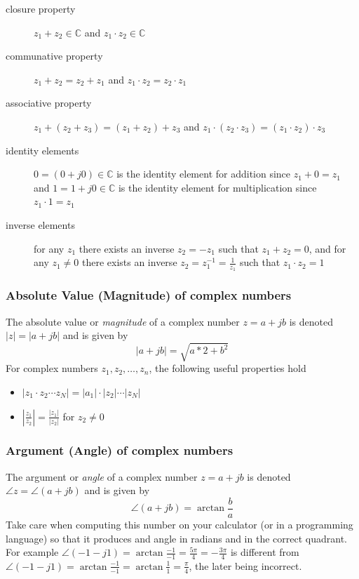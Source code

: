\begin{description}
\item[closure property] $z_1 + z_2 \in \mathbb{C}$ and  $z_1 \cdot z_2 \in \mathbb{C}$ 
\item[communative property] $z_1 + z_2 = z_2 + z_1$ and $z_1 \cdot z_2 = z_2 \cdot z_1$ 
\item[associative property] $z_1 + (z_2 + z_3) = (z_1 + z_2) + z_3$ and $z_1 \cdot (z_2 \cdot z_3) = (z_1 \cdot z_2) \cdot z_3$ 
\item[identity elements] $0 = (0 + j0) \in \mathbb{C}$ is the identity element for addition since $z_1 + 0 = z_1$ and $1 = 1 + j0 \in \mathbb{C}$ is the identity element for multiplication since $z_1\cdot 1 = z_1$ 
\item[inverse elements] for any $z_1$ there exists an inverse $z_2 = -z_1$ such that $z_1 + z_2 = 0$, and for any $z_1 \neq 0$ there exists an inverse $z_2 = z_1^{-1} = \tfrac{1}{z_1}$ such that $z_1 \cdot z_2 = 1$
\end{description}

\subsubsection*{Absolute Value (Magnitude) of complex numbers}

The absolute value or \textit{magnitude} of a complex number $z = a + jb$ is denoted $|z| = |a+jb|$ and is given by
\[
|a + jb| = \sqrt{a*2 + b^2}
\]
For complex numbers $z_1, z_2, \ldots, z_n$, the following useful properties hold
\begin{itemize}
\item $|z_1\cdot z_2 \cdots z_N| = |a_1|\cdot |z_2|\cdots|z_N|$
\item $\left| \frac{z_1}{z_2}\right| = \frac{|z_1|}{|z_2|}$ for $z_2 \neq 0$
\end{itemize}

\subsubsection*{Argument (Angle) of complex numbers}
The argument or \textit{angle} of a complex number $z = a + jb$ is denoted $\angle z = \angle(a+jb)$ and is given by
\[
\angle(a + jb) = \arctan\frac{b}{a}
\]
Take care when computing this number on your calculator (or in a programming language) so that it produces and angle in radians and in the correct quadrant. For example $\angle(-1-j1) = \arctan\frac{-1}{-1} = \frac{5\pi}{4} = -\frac{3\pi}{4}$ is different from $\angle(-1-j1) = \arctan\frac{-1}{-1} = \arctan\frac{1}{1} = \frac{\pi}{4}$, the later being incorrect.

